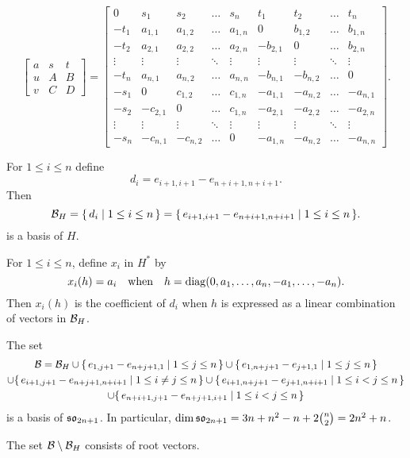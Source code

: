 \[
\begin{bmatrix}
  a&s&t\\ u&A&B\\ v&C& D
\end{bmatrix}
=
\begin{bmatrix}
  0&s_1&s_2&\dots&s_n &t_1&t_2&\dots&t_n\\
  -t_1& a_{1,1}&a_{1,2}&\dots&a_{1,n}&0&b_{1,2}&\dots&b_{1,n} \\
  -t_2& a_{2,1}&a_{2,2}&\dots&a_{2,n}&-b_{2,1}&0&\dots&b_{2,n} \\
  \vdots&\vdots&\vdots&\ddots&\vdots&\vdots&\vdots&\ddots&\vdots \\
  -t_n& a_{n,1}&a_{n,2}&\dots&a_{n,n}&-b_{n,1}&-b_{n,2}&\dots&0 \\
  -s_1& 0&c_{1,2}&\dots&c_{1,n}&-a_{1,1}&-a_{n,2}&\dots&-a_{n,1} \\
  -s_2& -c_{2,1}&0&\dots&c_{1,n}&-a_{2,1}&-a_{2,2}&\dots&-a_{2,n} \\
  \vdots & \vdots&\vdots&\ddots&\vdots&\vdots&\vdots&\ddots&\vdots \\
  -s_n& -c_{n,1}&-c_{n,2}&\dots&0&-a_{1,n}&-a_{n,2}&\dots&-a_{n,n}
\end{bmatrix}.
\]

For $1\leq i\leq n$ define
\[
d_i= e_{i+1,i+1}-e_{n+i+1,n+i+1}.
\]
Then
\[
{\mathcal B}_H= \{\,d_i\mid 1\leq i\leq n\,\}= \{\,e_{i+1,i+1}-e_{n+i+1,n+i+1}\mid
1\leq i\leq n\,\}.
\]
is a basis of $H$.

For $1\leq i\leq n$, define $x_i$ in $H^*$ by
\[
x_i(h)= a_i\quad\text{when}\quad h={\operatorname{diag}(0,a_1,\dots,a_n, -a_1,\dots,-a_n)}.
\]
Then $x_i(h)$ is the coefficient of $d_i$ when $h$ is expressed as a linear
combination of vectors in ${\mathcal B}_H$.

The set
\begin{multline*}
  {\mathcal B}={\mathcal B}_H \cup \{\, e_{1, j+1}-e_{n+j+1,1}\mid 1\leq j\leq n\,\} \cup \{\,
  e_{1, n+j+1}-e_{j+1,1}\mid 1\leq j\leq n\,\} \\
  \cup \{\, e_{i+1,j+1} -e_{n+j+1, n+i+1} \mid 1\leq i\ne j\leq n\,\} \cup
  \{\, e_{i+1,n+j+1} -e_{j+1, n+i+1} \mid 1\leq i< j\leq n\,\}  \\
  \cup \{\, e_{n+i+1,j+1} -e_{n+j+1, i+1}\mid 1\leq i< j\leq n\,\}
\end{multline*}
is a basis of $\mathfrak {so}_{2n+1}$. In particular, $\dim \mathfrak {so}_{2n+1}=
3n+n^2-n+2\binom n2= 2n^2+n$.

\begin{proposition}
  The set ${\mathcal B}\setminus {\mathcal B}_H$ consists of root vectors.
\end{proposition}

